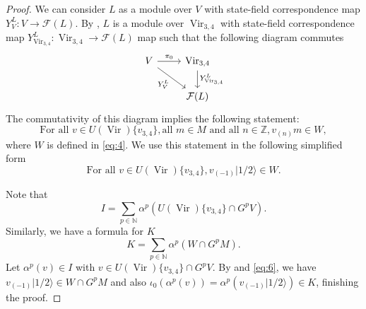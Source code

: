 \documentclass[12pt, a4paper]{article}
\theoremstyle{remark}
\DeclareMathOperator{\Vir}{Vir}
\newcommand{\vachalf}{|1/2\rangle}
\begin{document}
\begin{proof}
  We can consider $L$ as a module over $V$ with state-field correspondence map $Y^L_{V}: V \to \mathcal{F}(L)$.
  By \cite[Theorem 4.2]{wang_rationality_1993}, $L$ is a module over $\Vir_{3,4}$ with state-field correspondence map $Y^L_{\Vir_{3, 4}}: \Vir_{3, 4} \to \mathcal{F}(L)$ map such that the following diagram commutes
  \begin{equation*}
    \begin{tikzcd}
      V \arrow[r, "\pi_0"] \arrow[rd, "{Y^{L}_{V}}"'] & {\Vir_{3, 4}} \arrow[d, "{Y^{L}_{\Vir_{3, 4}}}"] \\
      & {\mathcal{F}(L)}
    \end{tikzcd}
  \end{equation*}
  The commutativity of this diagram implies the following statement:
  \begin{equation*}
    \text{For all }v \in U(\Vir)\{v_{3, 4}\}, \text{all } m \in M\text{ and  all }n \in \mathbb{Z}, v_{(n)}m \in W,
  \end{equation*}
  where $W$ is defined in \eqref{eq:4}.
  We use this statement in the following simplified form
  \begin{equation}
    \label{eq:6}
    \text{For all }v \in U(\Vir)\{v_{3, 4}\}, v_{(-1)}\vachalf \in W.
  \end{equation}
  
  Note that
  \begin{equation*}
    I = \sum_{p \in \mathbb{N}}\alpha^p(U(\Vir)\{v_{3, 4}\} \cap G^pV).
  \end{equation*}
  Similarly, we have a formula for $K$
  \begin{equation*}
    K = \sum_{p \in \mathbb{N}}\alpha^p(W \cap G^pM).
  \end{equation*}
  Let $\alpha^p(v) \in I$ with $v \in U(\Vir)\{v_{3, 4}\} \cap G^pV$.
  By  and \eqref{eq:6}, we have $v_{(-1)}\vachalf \in W \cap G^pM$ and also $\iota_0(\alpha^p(v)) = \alpha^p(v_{(-1)}\vachalf) \in K$, finishing the proof.  
\end{proof}
\end{document}
